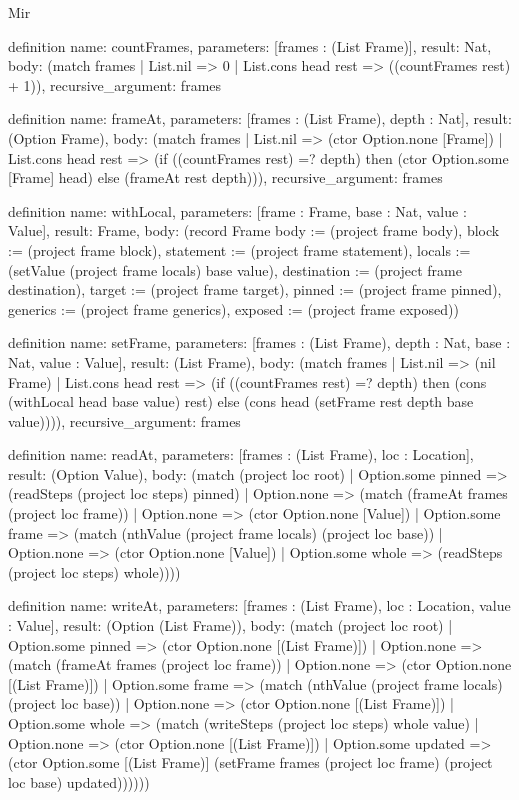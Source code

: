 \begin{lexlean}{Mir}
\begin{semanticmodule}
definition{
  name: countFrames,
  parameters: [frames : (List Frame)],
  result: Nat,
  body: (match frames | List.nil => 0 | List.cons head rest => ((countFrames rest) + 1)),
  recursive_argument: frames
}

definition{
  name: frameAt,
  parameters: [frames : (List Frame), depth : Nat],
  result: (Option Frame),
  body: (match frames
    | List.nil => (ctor Option.none [Frame])
    | List.cons head rest => (if ((countFrames rest) =? depth) then (ctor Option.some [Frame] head) else (frameAt rest depth))),
  recursive_argument: frames
}

definition{
  name: withLocal,
  parameters: [frame : Frame, base : Nat, value : Value],
  result: Frame,
  body: (record Frame {body := (project frame body), block := (project frame block), statement := (project frame statement), locals := (setValue (project frame locals) base value), destination := (project frame destination), target := (project frame target), pinned := (project frame pinned), generics := (project frame generics), exposed := (project frame exposed)})
}

definition{
  name: setFrame,
  parameters: [frames : (List Frame), depth : Nat, base : Nat, value : Value],
  result: (List Frame),
  body: (match frames
    | List.nil => (nil Frame)
    | List.cons head rest => (if ((countFrames rest) =? depth) then (cons (withLocal head base value) rest) else (cons head (setFrame rest depth base value)))),
  recursive_argument: frames
}

definition{
  name: readAt,
  parameters: [frames : (List Frame), loc : Location],
  result: (Option Value),
  body: (match (project loc root)
    | Option.some pinned => (readSteps (project loc steps) pinned)
    | Option.none => (match (frameAt frames (project loc frame))
      | Option.none => (ctor Option.none [Value])
      | Option.some frame => (match (nthValue (project frame locals) (project loc base))
        | Option.none => (ctor Option.none [Value])
        | Option.some whole => (readSteps (project loc steps) whole))))
}

definition{
  name: writeAt,
  parameters: [frames : (List Frame), loc : Location, value : Value],
  result: (Option (List Frame)),
  body: (match (project loc root)
    | Option.some pinned => (ctor Option.none [(List Frame)])
    | Option.none => (match (frameAt frames (project loc frame))
    | Option.none => (ctor Option.none [(List Frame)])
    | Option.some frame => (match (nthValue (project frame locals) (project loc base))
      | Option.none => (ctor Option.none [(List Frame)])
      | Option.some whole => (match (writeSteps (project loc steps) whole value)
        | Option.none => (ctor Option.none [(List Frame)])
        | Option.some updated => (ctor Option.some [(List Frame)] (setFrame frames (project loc frame) (project loc base) updated))))))
}


\end{semanticmodule}
\end{lexlean}
